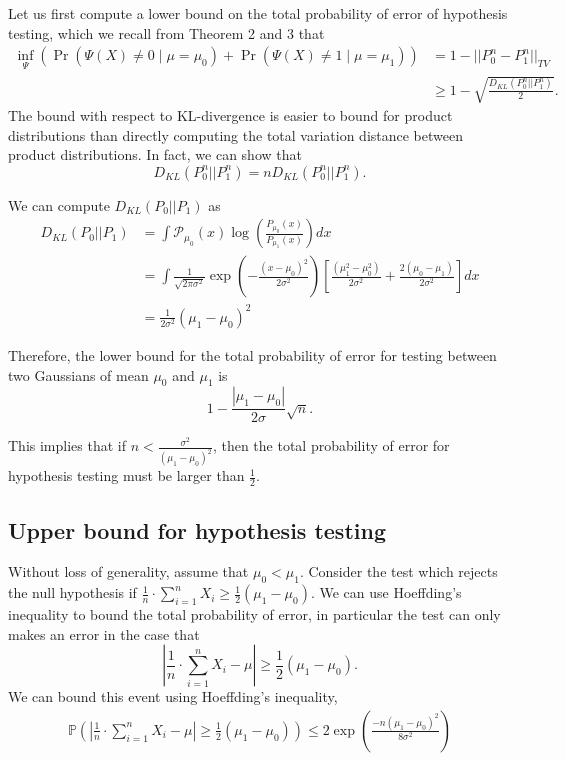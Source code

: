 \documentclass{article}
\newcommand{\Pd}{\mathcal{P}}
\begin{document}
	Let us first compute a lower bound on the total probability of error of hypothesis testing, which we recall from Theorem 2 and 3 that 
	\begin{align*}
	\inf_{\Psi}\left( \Pr(\Psi(X) \neq 0 \mid \mu = \mu_0) + \Pr(\Psi(X) \neq 1 \mid \mu = \mu_1) \right) &= 1 - || P_0^n - P_1^n ||_{TV} \\
	&\geq 1 - \sqrt{\frac{D_{KL}(P_0^n || P_1^n)}{2}} .
	\end{align*}
	The bound with respect to KL-divergence is easier to bound for product distributions than directly computing the total variation distance between product distributions. In fact, we can show that
	\[D_{KL}(P_0^n || P_1^n) = n D_{KL}(P_0^n || P_1^n).\]
	
	We can compute $D_{KL}(P_0 || P_1)$ as
	\begin{align*}
	D_{KL}(P_0 || P_1) &= \int \Pd_{\mu_0}(x) \log\left(\frac{P_{\mu_0}(x)}{P_{\mu_1}(x)}\right) dx\\
	&= \int \frac{1}{\sqrt{2\pi \sigma^2}} \exp\left(-\frac{(x-\mu_0)^2}{2\sigma^2}\right)\left[\frac{(\mu_1^2-\mu_0^2)}{2\sigma^2} +\frac{2(\mu_0-\mu_1)}{2\sigma^2} \right] dx \\
	&= \frac{1}{2\sigma^2}\left(\mu_1 - \mu_0\right)^2
	\end{align*}
	
	Therefore, the lower bound for the total probability of error for testing between two Gaussians of mean $\mu_0$ and $\mu_1$ is 
	\[1 -  \frac{|\mu_1 - \mu_0|}{2\sigma}\sqrt{n}.\]
	
	This implies that if $n < \frac{\sigma^2}{(\mu_1 - \mu_0)^2}$, then the total probability of error for hypothesis testing must be larger than $\frac12$.
	
	\subsection{Upper bound for hypothesis testing}
	Without loss of generality, assume that $\mu_0 < \mu_1$. Consider the test which rejects the null hypothesis if $\frac{1}{n}\cdot \sum_{i=1}^n X_i \geq \frac12 (\mu_1 - \mu_0)$. We can use Hoeffding's inequality to bound the total probability of error, in particular the test can only makes an error in the case that
	\[\left|\frac{1}{n}\cdot \sum_{i=1}^n X_i - \mu\right| \geq \frac12 (\mu_1 - \mu_0).\]
	We can bound this event using Hoeffding's inequality,
	\begin{align*}
	\mathbb{P}\left(\left|\frac{1}{n}\cdot \sum_{i=1}^n X_i - \mu\right| \geq \frac12 (\mu_1 - \mu_0)\right)
	\leq 2 \exp\left(\frac{-n (\mu_1 - \mu_0)^2}{8\sigma^2}\right)
	\end{align*}
	
\end{document}
